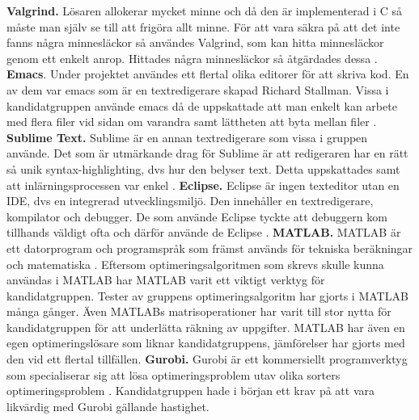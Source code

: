 \newline
\newline
\textbf{Valgrind.} Lösaren allokerar mycket minne och då den är implementerad i C så måste man själv se till att frigöra allt minne. För att vara säkra på att det inte fanns några minnesläckor så användes Valgrind, som kan hitta minnesläckor genom ett enkelt anrop. Hittades några minnesläckor så åtgärdades dessa \citep{valgrind}.
\newline
\newline
\textbf{Emacs}. Under projektet användes ett flertal olika editorer för att skriva kod. En av dem var emacs som är en textredigerare skapad Richard 	Stallman. Vissa i kandidatgruppen använde emacs då de uppskattade att man enkelt kan arbete med flera filer vid sidan om varandra samt lättheten att byta mellan filer \citep{emacs}.
\newline
\newline
\textbf{Sublime Text.} Sublime är en annan textredigerare som vissa i gruppen använde. Det som är utmärkande drag för Sublime är att redigeraren har en rätt så unik syntax-highlighting, dvs hur den belyser text. Detta uppskattades samt att inlärningsprocessen var enkel \citep{sublime}.
\newline
\newline
\textbf{Eclipse.} Eclipse är ingen texteditor utan en IDE, dvs en integrerad utvecklingsmiljö. Den innehåller en textredigerare, kompilator och debugger. De som använde Eclipse tyckte att debuggern kom tillhands väldigt ofta och därför använde de Eclipse \citep{eclipse}.
\newline
\newline
\textbf{MATLAB.} MATLAB är ett datorprogram och programspråk som främst används för tekniska beräkningar och matematiska \citep{matlab}. Eftersom optimeringsalgoritmen som skrevs skulle kunna användas i MATLAB har MATLAB varit ett viktigt verktyg för kandidatgruppen. Tester av gruppens optimeringsalgoritm har gjorts i MATLAB många gånger. Även MATLABs matrisoperationer har varit till stor nytta för kandidatgruppen för att underlätta räkning av uppgifter. MATLAB har även en egen optimeringslösare som liknar kandidatgruppens, jämförelser har gjorts med den vid ett flertal tillfällen.
\newline
\newline
\textbf{Gurobi.} Gurobi är ett kommersiellt programverktyg som specialiserar sig att lösa optimeringsproblem utav olika sorters optimeringsproblem \citep{gurobi}. Kandidatgruppen hade i början ett krav på att vara likvärdig med Gurobi gällande hastighet.
